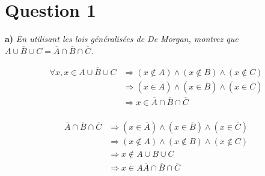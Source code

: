 \section*{Question 1}

\noindent
{\large \textbf{a)}}
\emph{En utilisant les lois généralisées de De Morgan, montrez que $\overline{A \cup B \cup C} = \overline{A} \cap \overline{B} \cap \overline{C}$.}

\bigskip
\fbox{\(\Rightarrow\)}
\begin{align*}
	\forall x, x \in \overline{A \cup B \cup C} & \Rightarrow (x \notin A) \wedge (x \notin B) \wedge (x \notin C) \\
	                                            & \Rightarrow (x \in \overline{A}) \wedge (x \in \overline{B}) \wedge (x \in \overline{C}) \\
	                                            & \Rightarrow x \in \overline{A} \cap \overline{B} \cap \overline{C} \\
\end{align*}

\bigskip
\fbox{\(\Leftarrow\)}
\begin{align*}
	\overline{A} \cap \overline{B} \cap \overline{C} & \Rightarrow (x \in \overline{A}) \wedge (x \in \overline{B}) \wedge (x \in \overline{C}) \\
	                                                 & \Rightarrow (x \notin A) \wedge (x \notin B) \wedge (x \notin C) \\
	                                                 & \Rightarrow x \notin A \cup B \cup C \\
	                                                 & \Rightarrow x \in A \overline{A} \cap \overline{B} \cap \overline{C}
\end{align*}